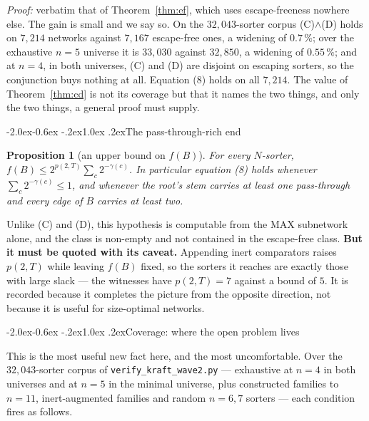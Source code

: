 \documentclass[11pt,a4paper]{article}
\makeatletter
\renewcommand\subsection{\@startsection{subsection}{2}{\z@}%
  {-2.0ex\@plus -0.6ex \@minus -.2ex}{1.0ex \@plus .2ex}{\normalfont\normalsize\bfseries}}
\newtheorem{proposition}[statement]{Proposition}
\makeatother
\begin{document}
\emph{Proof:} verbatim that of Theorem~\ref{thm:ef}, which uses escape-freeness
nowhere else. The gain is small and we say so. On the $32{,}043$-sorter corpus
(C)$\wedge$(D) holds on $7{,}214$ networks against $7{,}167$ escape-free ones, a
widening of $0.7\,\%$; over the exhaustive $n = 5$ universe it is $33{,}030$
against $32{,}850$, a widening of $0.55\,\%$; and at $n = 4$, in both universes,
(C) and (D) are disjoint on escaping sorters, so the conjunction buys nothing at
all. Equation (8) holds on all $7{,}214$. The value of Theorem~\ref{thm:cd} is
not its coverage but that it names the two things, and only the two things, a
general proof must supply.

\subsection{The pass-through-rich end}

\begin{proposition}[an upper bound on $f(B)$]
\label{prop:rich}
For every $N$-sorter, $f(B) \le 2^{p(2,T)} \sum_c 2^{-\gamma(c)}$. In
particular equation (8) holds whenever $\sum_c 2^{-\gamma(c)} \le 1$, and
whenever the root's stem carries at least one pass-through and every edge of $B$
carries at least two.
\end{proposition}

Unlike (C) and (D), this hypothesis is computable from the MAX subnetwork alone,
and the class is non-empty and not contained in the escape-free class.
\textbf{But it must be quoted with its caveat.} Appending inert comparators
raises $p(2,T)$ while leaving $f(B)$ fixed, so the sorters it reaches are
exactly those with large slack --- the witnesses have $p(2,T) = 7$ against a
bound of $5$. It is recorded because it completes the picture from the opposite
direction, not because it is useful for size-optimal networks.

\subsection{Coverage: where the open problem lives}

This is the most useful new fact here, and the most uncomfortable. Over the
$32{,}043$-sorter corpus of \texttt{verify\_kraft\_wave2.py} --- exhaustive at
$n = 4$ in both universes and at $n=5$ in the minimal universe, plus constructed
families to $n = 11$, inert-augmented families and random $n = 6,7$ sorters ---
each condition fires as follows.
\end{document}
